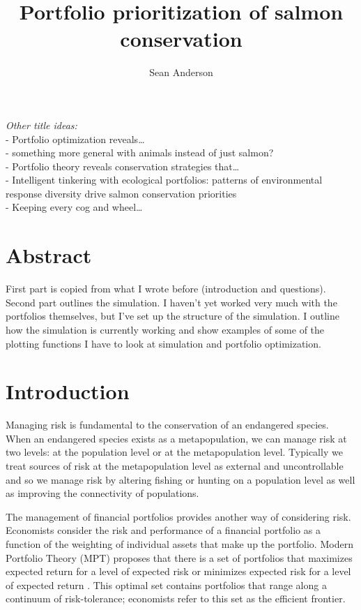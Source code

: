 \documentclass[12pt]{article}
\title{Portfolio prioritization of salmon conservation}
\author{Sean Anderson}
\date{}
\begin{document}
\maketitle

\emph{Other title ideas:}\\- Portfolio optimization reveals\ldots{}\\-
something more general with animals instead of just salmon?\\- Portfolio
theory reveals conservation strategies that\ldots{}\\- Intelligent
tinkering with ecological portfolios: patterns of environmental response
diversity drive salmon conservation priorities\\- Keeping every cog and
wheel\ldots{}

\section{Abstract}

First part is copied from what I wrote before (introduction and
questions). Second part outlines the simulation. I haven't yet worked
very much with the portfolios themselves, but I've set up the structure
of the simulation. I outline how the simulation is currently working and
show examples of some of the plotting functions I have to look at
simulation and portfolio optimization.

\section{Introduction}

Managing risk is fundamental to the conservation of an endangered
species. When an endangered species exists as a metapopulation, we can
manage risk at two levels: at the population level or at the
metapopulation level. Typically we treat sources of risk at the
metapopulation level as external and uncontrollable and so we manage
risk by altering fishing or hunting on a population level as well as
improving the connectivity of populations.

The management of financial portfolios provides another way of
considering risk. Economists consider the risk and performance of a
financial portfolio as a function of the weighting of individual assets
that make up the portfolio. Modern Portfolio Theory (MPT) proposes that
there is a set of portfolios that maximizes expected return for a level
of expected risk or minimizes expected risk for a level of expected
return \citep{Markowitz1952, Markowitz1959}. This optimal set contains
portfolios that range along a continuum of risk-tolerance; economists
refer to this set as the efficient frontier.
\end{document}
